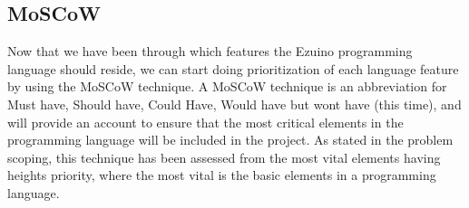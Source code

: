 \subsection{MoSCoW}
Now that we have been through which features the Ezuino programming language should reside, we can start doing prioritization of each language feature by using the MoSCoW technique. A MoSCoW technique is an abbreviation for Must have, Should have, Could Have, Would have but wont have (this time), and will provide an account to ensure that the most critical elements in the programming language will be included in the project. As stated in the problem scoping, this technique has been assessed from the most vital elements having heights priority, where the most vital is the basic elements in a programming language. 


